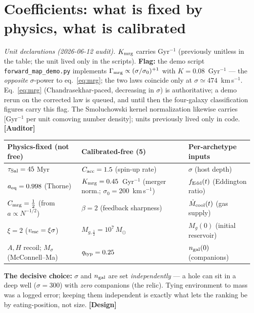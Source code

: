 \documentclass[11pt]{article}
\newcommand{\Design}{\textbf{\textcolor{purple!65!black}{[Design]}}}
\newcommand{\Auditor}{\textbf{\textcolor{teal!55!black}{[Auditor]}}}
\newcommand{\msun}{M_\odot}
\newcommand{\Msig}{M_\sigma}
\begin{document}
\section{Coefficients: what is fixed by physics, what is calibrated}
\noindent\emph{Unit declarations (2026-06-12 audit).} $K_{\rm mrg}$ carries Gyr$^{-1}$ (previously unitless in the table; the unit lived only in the scripts). \textbf{Flag:} the demo script \texttt{forward\_map\_demo.py} implements $\Gamma_{\rm mrg}\propto(\sigma/\sigma_0)^{+1}$ with $K=0.08$~Gyr$^{-1}$ --- the \emph{opposite} $\sigma$-power to eq.~\eqref{eq:mrg}; the two laws coincide only at $\sigma\simeq474$~km\,s$^{-1}$. Eq.~\eqref{eq:mrg} (Chandrasekhar-paced, decreasing in $\sigma$) is authoritative; a demo rerun on the corrected law is queued, and until then the four-galaxy classification figures carry this flag. The Smoluchowski kernel normalization likewise carries [Gyr$^{-1}$ per unit comoving number density]; units previously lived only in code. \Auditor

\begin{center}\small
\begin{tabular}{@{}lll@{}}
\toprule
\textbf{Physics-fixed (not free)} & \textbf{Calibrated-free (5)} & \textbf{Per-archetype inputs} \\
\midrule
$\tau_{\rm Sal}=45$ Myr & $C_{\rm acc}=1.5$ (spin-up rate) & $\sigma$ (host depth) \\
$a_{\rm eq}=0.998$ (Thorne) & $K_{\rm mrg}=0.45$~Gyr$^{-1}$ (merger norm.; $\sigma_0=200$~km\,s$^{-1}$) & $f_{\rm Edd}(t)$ (Eddington ratio) \\
$C_{\rm mrg}=\tfrac12$ (from $a\!\propto\!N^{-1/2}$) & $\beta=2$ (feedback sharpness) & $\dot M_{\rm cool}(t)$ (gas supply) \\
$\xi=2$ ($v_{\rm esc}=\xi\sigma$) & $M_{g,\frac12}=10^{7}\,\msun$ & $M_g(0)$ (initial reservoir) \\
$A,H$ recoil; $\Msig$ (McConnell--Ma) & $q_{\rm typ}=0.25$ & $n_{\rm gal}(0)$ (companions) \\
\bottomrule
\end{tabular}
\end{center}
\textbf{The decisive choice:} $\sigma$ and $n_{\rm gal}$ are set \emph{independently} --- a hole can sit in a deep well ($\sigma=300$) with \emph{zero} companions (the relic). Tying environment to mass was a logged error; keeping them independent is exactly what lets the ranking be by eating-position, not size. \Design
\end{document}
